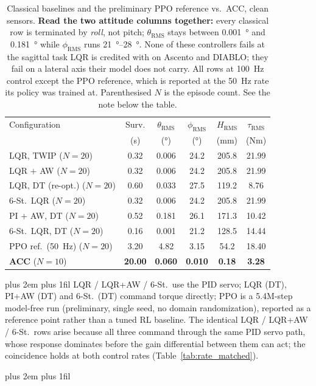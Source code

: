 \documentclass[a4paper,fleqn]{cas-dc}
\newcommand{\tabnote}{\par\leftskip=0pt\rightskip=0pt plus 2em%
  \parfillskip=0pt plus 1fil\relax}
\begin{document}
\begin{table}[pos=!tbp]
\centering
\footnotesize
\caption{Classical baselines and the preliminary PPO reference vs.\ ACC, clean sensors. \textbf{Read the two attitude columns together:} every classical row is terminated by \emph{roll}, not pitch; $\theta_{\text{RMS}}$ stays between \SI{0.001}{\degree} and \SI{0.181}{\degree} while $\phi_{\text{RMS}}$ runs \SIrange{21}{28}{\degree}. None of these controllers fails at the sagittal task LQR is credited with on Ascento and DIABLO; they fail on a lateral axis their model does not carry. All rows at \SI{100}{Hz} control except the PPO reference, which is reported at the \SI{50}{Hz} rate its policy was trained at. Parenthesised $N$ is the episode count. See the note below the table.}
\label{tab:lqr_baselines}
\setlength{\tabcolsep}{4pt}
\begin{tabular}{@{}l S[table-format=2.2] S[table-format=1.3] S[table-format=2.2] S[table-format=3.1] S[table-format=2.2]@{}}
\toprule
Configuration & {Surv.} & {$\theta_{\text{RMS}}$} & {$\phi_{\text{RMS}}$} & {$H_{\text{RMS}}$} & {$\tau_{\text{RMS}}$} \\
& {(s)} & {(\si{\degree})} & {(\si{\degree})} & {(mm)} & {(Nm)} \\
\midrule
LQR, TWIP ($N{=}20$)         & 0.32 & 0.006 & 24.2 & 205.8 & 21.99 \\
LQR $+$ AW ($N{=}20$)        & 0.32 & 0.006 & 24.2 & 205.8 & 21.99 \\
LQR, DT (re-opt.) ($N{=}20$) & 0.60 & 0.033 & 27.5 & 119.2 & 8.76 \\
6-St.\ LQR ($N{=}20$)        & 0.32 & 0.006 & 24.2 & 205.8 & 21.99 \\
PI $+$ AW, DT ($N{=}20$)     & 0.52 & 0.181 & 26.1 & 171.3 & 10.42 \\
6-St.\ LQR, DT ($N{=}20$)    & 0.16 & 0.001 & 21.2 & 128.5 & 14.44 \\
PPO ref.\ (\SI{50}{Hz}) ($N{=}20$)& 3.20 & 4.82  & 3.15 & 54.2  & 18.40 \\
\addlinespace
\textbf{ACC} ($N{=}10$)      & \bfseries 20.00 & \bfseries 0.060 & \bfseries 0.010 & \bfseries 0.18 & \bfseries 3.28 \\
\bottomrule
\end{tabular}
\vspace{3pt}\tabnote\noindent\footnotesize
LQR / LQR+AW / 6-St.\ use the PID servo; LQR (DT), PI+AW (DT) and 6-St.\ (DT) command torque directly; PPO is a 5.4M-step model-free run (preliminary, single seed, no domain randomization), reported as a reference point rather than a tuned RL baseline. The identical LQR / LQR+AW / 6-St.\ rows arise because all three command through the same PID servo path, whose response dominates before the gain differential between them can act; the coincidence holds at both control rates (Table~\ref{tab:rate_matched}).\tabnote\noindent

\end{table}
\end{document}
